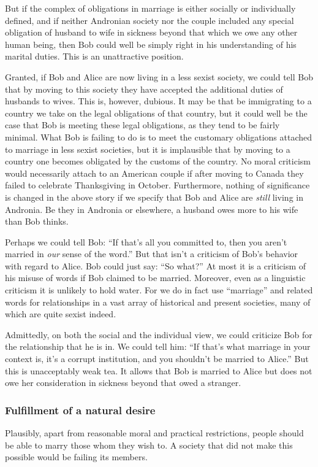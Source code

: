 But if the complex of obligations in marriage is either socially or individually defined, and if neither Andronian society nor the couple included
any special obligation of husband to wife in sickness beyond that which we owe any other human being, then Bob could well be simply right in his understanding
of his marital duties. This is an unattractive position.

Granted, if Bob and Alice are now living in a less sexist society, we could tell Bob that by moving to this society they have accepted the additional
duties of husbands to wives. This is, however, dubious. It may be that be immigrating to a country we take on the legal obligations of that
country, but it could well be the case that Bob is meeting these legal obligations, as they tend to be fairly minimal. What Bob is failing to do is
to meet the customary obligations attached to marriage in less sexist societies, but it is implausible that by moving to a country one becomes obligated
by the customs of the country. No moral criticism would necessarily attach to an American couple if after moving to Canada they failed to celebrate
Thanksgiving in October. Furthermore, nothing of significance is changed in the above story if we specify that Bob and Alice are \textit{still} living in
Andronia. Be they in Andronia or elsewhere, a husband owes more to his wife than Bob thinks.

Perhaps we could tell Bob: ``If that's all you committed to, then you aren't married in \textit{our} sense of the word.''
But that isn't a criticism of Bob's behavior with regard to Alice. Bob could just say: ``So what?'' At most it is a criticism of his misuse of words if Bob
claimed to be  married. Moreover, even as a linguistic criticism it is unlikely to hold water. For we do in fact use ``marriage'' and related words for relationships in
a vast array of historical and present societies, many of which are quite sexist indeed.

Admittedly, on both the social and the individual view, we could criticize Bob for the relationship that he is in. We could tell him: ``If that's what marriage
in your context is, it's a corrupt institution, and you shouldn't be married to Alice.'' But this is unacceptably weak tea. It allows that Bob is married to Alice but does
not owe her consideration in sickness beyond that owed a stranger.

\subsubsection{Fulfillment of a natural desire}
Plausibly, apart from reasonable moral and practical restrictions, people should be able to marry those whom they wish to. A society that did not make this
possible would be failing its members.

